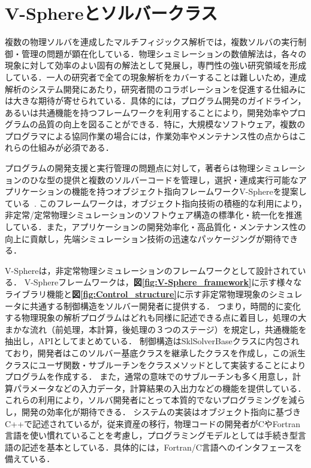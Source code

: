 
\graphicspath{{./fig1/}}

\section{V-Sphereとソルバークラス}
\label{sec:1.1}
複数の物理ソルバを連成したマルチフィジックス解析では，複数ソルバの実行制御・管理の問題が顕在化している．物理シュミレーションの数値解法は，各々の現象に対して効率のよい固有の解法として発展し，専門性の強い研究領域を形成している．一人の研究者で全ての現象解析をカバーすることは難しいため，連成解析のシステム開発にあたり，研究者間のコラボレーションを促進する仕組みには大きな期待が寄せられている．具体的には，プログラム開発のガイドライン，あるいは共通機能を持つフレームワークを利用することにより，開発効率やプログラムの品質の向上を図ることができる．特に，大規模なソフトウェア，複数のプログラマによる協同作業の場合には，作業効率やメンテナンス性の点からはこれらの仕組みが必須である．

プログラムの開発支援と実行管理の問題点に対して，著者らは物理シミュレーションのひな型の提供と複数のソルバーコードを管理し，選択・連成実行可能なアプリケーションの機能を持つオブジェクト指向フレームワークV-Sphereを提案している~\cite{ono:V-SphereJSCES, ono:V-SphereACS18, ono:SphereParCFD08}.
このフレームワークは，オブジェクト指向技術の積極的な利用により，非定常/定常物理シミュレーションのソフトウェア構造の標準化・統一化を推進している．また，アプリケーションの開発効率化・高品質化・メンテナンス性の向上に貢献し，先端シミュレーション技術の迅速なパッケージングが期待できる．

V-Sphereは，非定常物理シミュレーションのフレームワークとして設計されている．
V-Sphereフレームワークは，\textbf{図\ref{fig:V-Sphere_framework}}に示す様々なライブラリ機能と\textbf{図\ref{fig:Control_structure}}に示す非定常物理現象のシミュレータに共通する制御構造をソルバー開発者に提供する．
つまり，時間的に変化する物理現象の解析プログラムはどれも同様に記述できる点に着目し，処理の大まかな流れ（前処理，本計算，後処理の３つのステージ）を規定し，共通機能を抽出し，APIとしてまとめている．
制御構造はSklSolverBaseクラスに内包されており，開発者はこのソルバー基底クラスを継承したクラスを作成し，この派生クラスにユーザ関数・サブルーチンをクラスメソッドとして実装することによりプログラムを作成する．
また，通常の意味でのサブルーチンも多く用意し，計算パラメータなどの入力データ，計算結果の入出力などの機能を提供している．
これらの利用により，ソルバ開発者にとって本質的でないプログラミングを減らし，開発の効率化が期待できる．
システムの実装はオブジェクト指向に基づきC++で記述されているが，従来資産の移行，物理コードの開発者がCやFortran言語を使い慣れていることを考慮し，プログラミングモデルとしては手続き型言語の記述を基本としている．具体的には，Fortran/C言語へのインタフェースを備えている．

